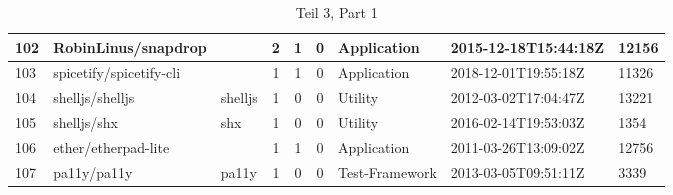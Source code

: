 \begin{landscape}
\begin{table}[]
{\begin{tabular}{lllccclll}
                102 & RobinLinus/snapdrop              &                        & 2                      & 1                 & 0                 & Application       & 2015-12-18T15:44:18Z & 12156          \\ \hline
                103 & spicetify/spicetify-cli          &                        & 1                      & 1                 & 0                 & Application       & 2018-12-01T19:55:18Z & 11326          \\ \hline
                104 & shelljs/shelljs                  & shelljs                & 1                      & 0                 & 0                 & Utility           & 2012-03-02T17:04:47Z & 13221          \\ \hline
                105 & shelljs/shx                      & shx                    & 1                      & 0                 & 0                 & Utility           & 2016-02-14T19:53:03Z & 1354           \\ \hline
                106 & ether/etherpad-lite              &                        & 1                      & 1                 & 0                 & Application       & 2011-03-26T13:09:02Z & 12756          \\ \hline
                107 & pa11y/pa11y                      & pa11y                  & 1                      & 0                 & 0                 & Test-Framework    & 2013-03-05T09:51:11Z & 3339
            \end{tabular}%
        }
        \caption*{Teil 3, Part 1}
    \end{table}
\end{landscape}



